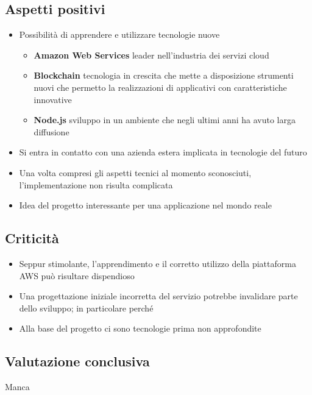 \subsection{Aspetti positivi}
\begin{itemize}
	\item Possibilità di apprendere e utilizzare tecnologie nuove
		\begin{itemize}
			\item \textbf{Amazon Web Services} leader nell'industria dei servizi cloud
			\item \textbf{Blockchain} tecnologia in crescita che mette a disposizione strumenti nuovi che permetto la realizzazioni di applicativi con caratteristiche innovative
			\item \textbf{Node.js} sviluppo in un ambiente che negli ultimi anni ha avuto larga diffusione
		\end{itemize}
	\item Si entra in contatto con una azienda estera implicata in tecnologie del futuro
	\item Una volta compresi gli aspetti tecnici al momento sconosciuti, l'implementazione non risulta complicata
	\item Idea del progetto interessante per una applicazione nel mondo reale
\end{itemize}

\subsection{Criticità}
\begin{itemize}
	\item Seppur stimolante, l'apprendimento e il corretto utilizzo della piattaforma AWS può risultare dispendioso
	\item Una progettazione iniziale incorretta del servizio potrebbe invalidare parte dello sviluppo; in particolare perché
	\item Alla base del progetto ci sono tecnologie prima non approfondite
\end{itemize}

\subsection{Valutazione conclusiva}
Manca